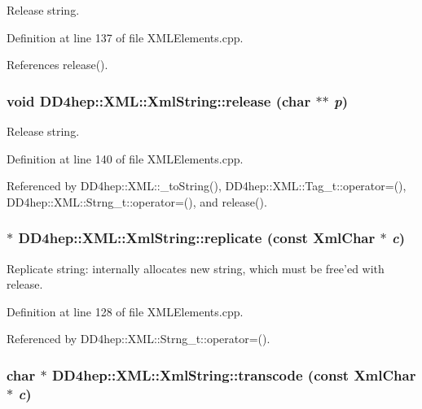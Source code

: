 Release string. 

Definition at line 137 of file XMLElements.cpp.

References release().\hypertarget{class_d_d4hep_1_1_x_m_l_1_1_xml_string_a42d7ff7f40a01e22f148a444526402ba}{
\subsubsection[{release}]{\setlength{\rightskip}{0pt plus 5cm}void DD4hep::XML::XmlString::release (char $\ast$$\ast$ {\em p})}}
\label{class_d_d4hep_1_1_x_m_l_1_1_xml_string_a42d7ff7f40a01e22f148a444526402ba}


Release string. 

Definition at line 140 of file XMLElements.cpp.

Referenced by DD4hep::XML::\_\-toString(), DD4hep::XML::Tag\_\-t::operator=(), DD4hep::XML::Strng\_\-t::operator=(), and release().\hypertarget{class_d_d4hep_1_1_x_m_l_1_1_xml_string_abdbc8c621c1b0f8659e89794aa9a38b5}{
\subsubsection[{replicate}]{ $\ast$ DD4hep::XML::XmlString::replicate (const {\bf XmlChar} $\ast$ {\em c})}}
\label{class_d_d4hep_1_1_x_m_l_1_1_xml_string_abdbc8c621c1b0f8659e89794aa9a38b5}


Replicate string: internally allocates new string, which must be free'ed with release. 

Definition at line 128 of file XMLElements.cpp.

Referenced by DD4hep::XML::Strng\_\-t::operator=().\hypertarget{class_d_d4hep_1_1_x_m_l_1_1_xml_string_a776e51170b0989bbe06f0031c169cb77}{
\subsubsection[{transcode}]{\setlength{\rightskip}{0pt plus 5cm}char $\ast$ DD4hep::XML::XmlString::transcode (const {\bf XmlChar} $\ast$ {\em c})}}
\label{class_d_d4hep_1_1_x_m_l_1_1_xml_string_a776e51170b0989bbe06f0031c169cb77}


